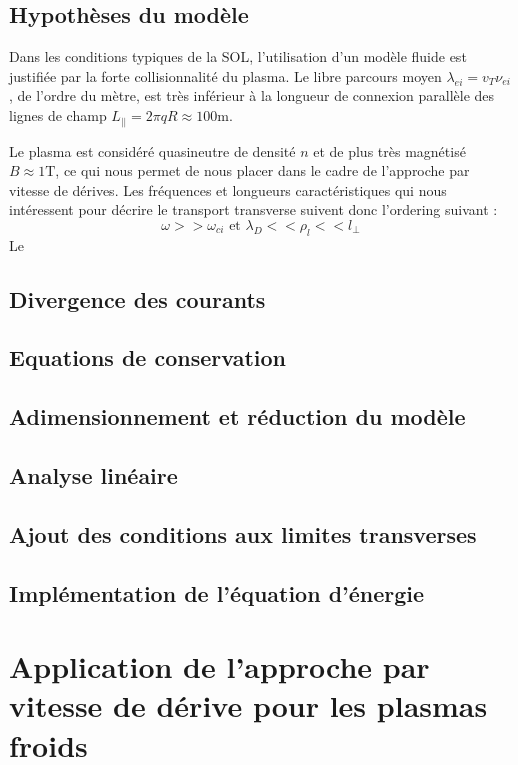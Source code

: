 		\subsection{Hypothèses du modèle}
Dans les conditions typiques de la SOL, l'utilisation d'un modèle fluide est justifiée par la
forte collisionnalité du plasma. Le libre
parcours moyen $\lambda_{ei}=v_T \nu_{ei}$, de l'ordre du mètre, est très inférieur à la longueur de connexion
parallèle des lignes de champ $L_{||}=2\pi q R\approx 100\text{m}$.

Le plasma est considéré quasineutre de densité $n$ et de plus très magnétisé $B\approx 1\text{T}$,
 ce qui nous permet de nous placer dans le cadre de
l'approche par vitesse de dérives. Les fréquences et longueurs caractéristiques
qui nous intéressent pour décrire le transport transverse suivent donc l'ordering suivant :
\begin{equation}
	\omega>>\omega_{ci} \text{ et } \lambda_D<<\rho_{l}<<l_{\perp}
\end{equation}
Le 




		
		\subsection{Divergence des courants}
		\subsection{Equations de conservation}
		\subsection{Adimensionnement et réduction du modèle}
		\subsection{Analyse linéaire}
		\subsection{Ajout des conditions aux limites transverses}
		\subsection{Implémentation de l'équation d'énergie}
	\section{Application de l'approche par vitesse de dérive pour les plasmas froids}
